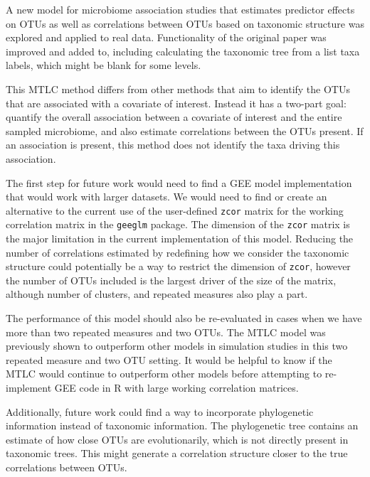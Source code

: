 \documentclass[12pt]{article}
\begin{document}
A new model for microbiome association studies that estimates predictor effects on OTUs as well as correlations between OTUs based on taxonomic structure was explored and applied to real data. Functionality of the original paper was improved and added to, including calculating the taxonomic tree from a list taxa labels, which might be blank for some levels.

This MTLC method differs from other methods that aim to identify the OTUs that are associated with a covariate of interest. Instead it has a two-part goal: quantify the overall association between a covariate of interest and the entire sampled microbiome, and also estimate correlations between the OTUs present. If an association is present, this method does not identify the taxa driving this association.

The first step for future work would need to find a GEE model implementation that would work with larger datasets. We would need to find or create an alternative to the current use of the user-defined \texttt{zcor} matrix for the working correlation matrix in the \texttt{geeglm} package. The dimension of the \texttt{zcor} matrix is the major limitation in the current implementation of this model. Reducing the number of correlations estimated by redefining how we consider the taxonomic structure could potentially be a way to restrict the dimension of \texttt{zcor}, however the number of OTUs included is the largest driver of the size of the matrix, although number of clusters, and repeated measures also play a part.

The performance of this model should also be re-evaluated in cases when we have more than two repeated measures and two OTUs. The MTLC model was previously shown to outperform other models in simulation studies in this two repeated measure and two OTU setting. It would be helpful to know if the MTLC would continue to outperform other models before attempting to re-implement GEE code in R with large working correlation matrices.

Additionally, future work could find a way to incorporate phylogenetic information instead of taxonomic information. The phylogenetic tree contains an estimate of how close OTUs are evolutionarily, which is not directly present in taxonomic trees. This might generate a correlation structure closer to the true correlations between OTUs.

\end{document}
